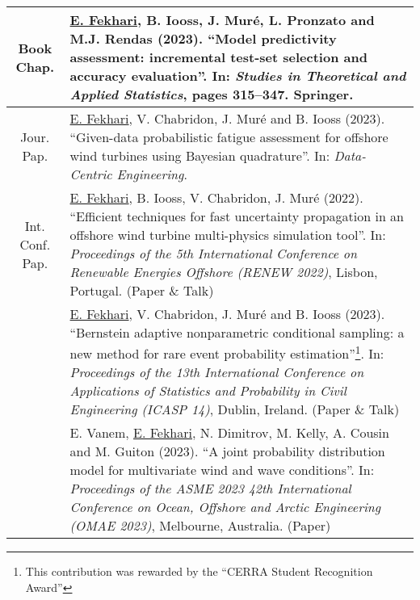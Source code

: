 \begin{center}
    \footnotesize
    \renewcommand*{\arraystretch}{1.4}
    \begin{tabularx}{\textwidth}{c X}
        Book Chap.      & \underline{E. Fekhari}, B. Iooss, J. Muré, L. Pronzato and M.J. Rendas (2023). 
                        ``Model predictivity assessment: incremental test-set selection and accuracy evaluation''. 
                        In: \textit{Studies in Theoretical and Applied Statistics}, pages 315--347. Springer.\\
        \hline  
        Jour. Pap.      & \underline{E. Fekhari}, V. Chabridon, J. Muré and B. Iooss (2023).
                        ``Given-data probabilistic fatigue assessment for offshore wind turbines using Bayesian quadrature''. 
                        In: \textit{Data-Centric Engineering}.\\

        \hline
\shortstack{Int. Conf.\\Pap.}& \underline{E. Fekhari}, B. Iooss, V. Chabridon, J. Muré (2022). 
                    ``Efficient techniques for fast uncertainty propagation in an offshore wind turbine multi-physics simulation tool''.
                    In: \textit{Proceedings of the 5th International Conference on Renewable Energies Offshore (RENEW 2022)}, Lisbon, Portugal. (Paper \& Talk)\\
        
                    & \underline{E. Fekhari}, V. Chabridon, J. Muré and B. Iooss (2023). 
                    ``Bernstein adaptive nonparametric conditional sampling: a new method for rare event probability estimation''\footnote{This contribution was rewarded by the ``CERRA Student Recognition Award''}.
                    In: \textit{Proceedings of the 13th International Conference on Applications of Statistics and Probability in Civil Engineering (ICASP 14)}, Dublin, Ireland. (Paper \& Talk)\\
        
                    & E. Vanem, \underline{E. Fekhari}, N. Dimitrov, M. Kelly, A. Cousin and M. Guiton (2023). 
                    ``A joint probability distribution model for multivariate wind and wave conditions''.
                    In: \textit{Proceedings of the ASME 2023 42th International Conference on Ocean, Offshore and Arctic Engineering (OMAE 2023)}, Melbourne, Australia. (Paper)\\
        

\end{tabularx}
\end{center}
